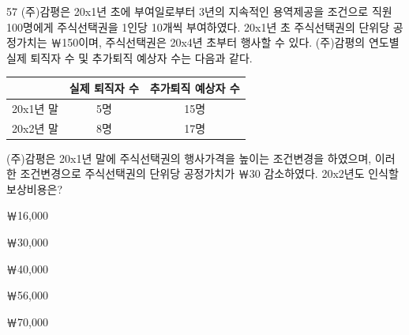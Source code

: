 \begin{question}{57}
(주)감평은 20x1년 초에 부여일로부터 3년의 지속적인 용역제공을 조건으로 직원 100명에게 주식선택권을 1인당 10개씩 부여하였다. 20x1년 초 주식선택권의 단위당 공정가치는 ￦150이며, 주식선택권은 20x4년 초부터 행사할 수 있다. (주)감평의 연도별 실제 퇴직자 수 및 추가퇴직 예상자 수는 다음과 같다.
\par{\small\centering
\begin{tabular}{|c|c|c|}
\hline
 & 실제 퇴직자 수 & 추가퇴직 예상자 수 \\ \hline
20x1년 말 & 5명 & 15명 \\ \hline
20x2년 말 & 8명 & 17명 \\ \hline
\end{tabular}\par}
(주)감평은 20x1년 말에 주식선택권의 행사가격을 높이는 조건변경을 하였으며, 이러한 조건변경으로 주식선택권의 단위당 공정가치가 ￦30 감소하였다. 20x2년도 인식할 보상비용은? \par
\begin{choices}
  \item ￦16,000
  \item ￦30,000
  \item ￦40,000
  \item ￦56,000
  \item ￦70,000
\end{choices}
\end{question}
